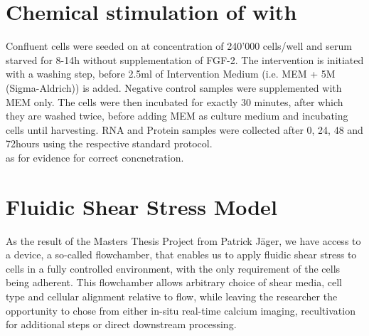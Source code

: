\section{Chemical stimulation of \Piezo{} with \Yoda{}}
\label{sec:ChemicalStimulation}
Confluent cells were seeded on  at concentration of 240'000 cells/well and serum starved for 8-14h without supplementation of FGF-2. 
The intervention is initiated with a washing step, before 2.5ml of Intervention Medium (i.e. MEM\textalpha{} + 5\textmu{}M \Yoda (Sigma-Aldrich)) is added. Negative control samples were supplemented with MEM\textalpha{} only. The cells were then incubated for exactly 30 minutes, after which they are washed twice, before adding MEM\textalpha{} as culture medium and incubating cells until harvesting. RNA and Protein samples were collected after 0, 24, 48 and 72hours using the respective standard protocol.\\ \cite{Morley2018} as for evidence for correct concnetration.

\section{Fluidic Shear Stress Model}
As the result of the Masters Thesis Project from Patrick Jäger, we have access to a device, a so-called flowchamber, that enables us to apply fluidic shear stress to cells in a fully controlled environment, with the only requirement of the cells being adherent. This flowchamber allows arbitrary choice of shear media, cell type and cellular alignment relative to flow, while leaving the researcher the opportunity to chose from either in-situ real-time calcium imaging, recultivation for additional steps or direct downstream processing.


